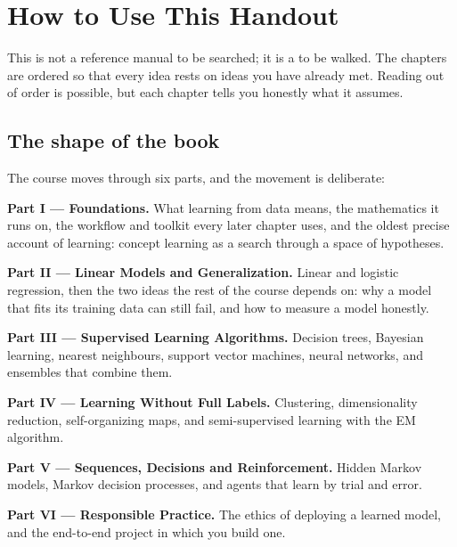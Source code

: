 \newpage

\chapter*{How to Use This Handout}

This is not a reference manual to be searched; it is a  to be walked.
The chapters are ordered so that every idea rests on ideas you have already met.
Reading out of order is possible, but each chapter tells you honestly what it
assumes.

\section*{The shape of the book}

The course moves through six parts, and the movement is deliberate:

\begin{tight}
  \item \textbf{Part I --- Foundations.} What learning from data means, the
        mathematics it runs on, the workflow and toolkit every later chapter
        uses, and the oldest precise account of learning: concept learning as a
        search through a space of hypotheses.
  \item \textbf{Part II --- Linear Models and Generalization.} Linear and
        logistic regression, then the two ideas the rest of the course depends
        on: why a model that fits its training data can still fail, and how to
        measure a model honestly.
  \item \textbf{Part III --- Supervised Learning Algorithms.} Decision trees,
        Bayesian learning, nearest neighbours, support vector machines, neural
        networks, and ensembles that combine them.
  \item \textbf{Part IV --- Learning Without Full Labels.} Clustering,
        dimensionality reduction, self-organizing maps, and semi-supervised
        learning with the EM algorithm.
  \item \textbf{Part V --- Sequences, Decisions and Reinforcement.} Hidden
        Markov models, Markov decision processes, and agents that learn by
        trial and error.
  \item \textbf{Part VI --- Responsible Practice.} The ethics of deploying a
        learned model, and the end-to-end project in which you build one.
\end{tight}

